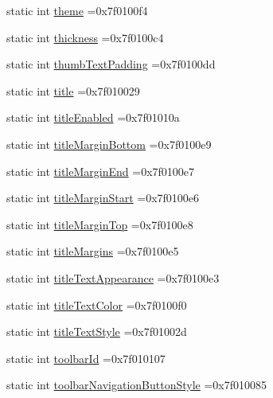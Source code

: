 \begin{DoxyCompactItemize}
\item 
static int \hyperlink{classandroid_1_1support_1_1v4_1_1R_1_1attr_ad29b1ce16c7b702bd1187fe041f2cda9}{theme} =0x7f0100f4
\item 
static int \hyperlink{classandroid_1_1support_1_1v4_1_1R_1_1attr_a30b3c9eb3da6af56431fd47ecc8ab38e}{thickness} =0x7f0100c4
\item 
static int \hyperlink{classandroid_1_1support_1_1v4_1_1R_1_1attr_abc9134fe1050fd996d652ba07079076f}{thumb\+Text\+Padding} =0x7f0100dd
\item 
static int \hyperlink{classandroid_1_1support_1_1v4_1_1R_1_1attr_aaa11a7e1e11d0e32f6bae3e8951a2fb8}{title} =0x7f010029
\item 
static int \hyperlink{classandroid_1_1support_1_1v4_1_1R_1_1attr_aa20397e6dba2afdfdd19964ccafba0f7}{title\+Enabled} =0x7f01010a
\item 
static int \hyperlink{classandroid_1_1support_1_1v4_1_1R_1_1attr_a208e8872b98d2610ddc09d40cd6b4390}{title\+Margin\+Bottom} =0x7f0100e9
\item 
static int \hyperlink{classandroid_1_1support_1_1v4_1_1R_1_1attr_afc14c13ceb344e3b222227ab895b9d5d}{title\+Margin\+End} =0x7f0100e7
\item 
static int \hyperlink{classandroid_1_1support_1_1v4_1_1R_1_1attr_ad5b0a1d0fcf3268e1431e0d357bb7cb8}{title\+Margin\+Start} =0x7f0100e6
\item 
static int \hyperlink{classandroid_1_1support_1_1v4_1_1R_1_1attr_a21cd245009a24be7a8a154fd9a167b5e}{title\+Margin\+Top} =0x7f0100e8
\item 
static int \hyperlink{classandroid_1_1support_1_1v4_1_1R_1_1attr_a68567d454e62f7fd26ab186363b999e8}{title\+Margins} =0x7f0100e5
\item 
static int \hyperlink{classandroid_1_1support_1_1v4_1_1R_1_1attr_abcf9d1c52112fe1f7d6defda965edf39}{title\+Text\+Appearance} =0x7f0100e3
\item 
static int \hyperlink{classandroid_1_1support_1_1v4_1_1R_1_1attr_a82b688a0bd0ebfb31f60e9f59a5191fe}{title\+Text\+Color} =0x7f0100f0
\item 
static int \hyperlink{classandroid_1_1support_1_1v4_1_1R_1_1attr_a504cda790d3f21fe9a084bf909d83e9a}{title\+Text\+Style} =0x7f01002d
\item 
static int \hyperlink{classandroid_1_1support_1_1v4_1_1R_1_1attr_a9a14427b7f59c731ec884ed181ef9390}{toolbar\+Id} =0x7f010107
\item 
static int \hyperlink{classandroid_1_1support_1_1v4_1_1R_1_1attr_a930882aabfb34152191aea6412ffe683}{toolbar\+Navigation\+Button\+Style} =0x7f010085

\end{DoxyCompactItemize}

